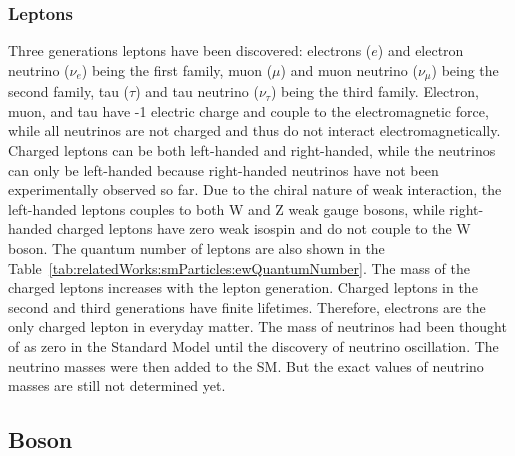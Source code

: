 \subsubsection{Leptons}
Three generations leptons have been discovered: electrons ($e$) and electron neutrino ($\nu_e$) being the first family, muon ($\mu$) and muon neutrino ($\nu_\mu$) being the second family, tau ($\tau$) and tau neutrino ($\nu_\tau$) being the third family. Electron, muon, and tau have -1 electric charge and couple to the electromagnetic force, while all neutrinos are not charged and thus do not interact electromagnetically. Charged leptons can be both left-handed and right-handed, while the neutrinos can only be left-handed because right-handed neutrinos have not been experimentally observed so far. Due to the chiral nature of weak interaction, the left-handed leptons couples to both W and Z weak gauge bosons, while right-handed charged leptons have zero weak isospin and do not couple to the W boson. The quantum number of leptons are also shown in the Table~\ref{tab:relatedWorks:smParticles:ewQuantumNumber}. The mass of the charged leptons increases with the lepton generation. Charged leptons in the second and third generations have finite lifetimes. Therefore, electrons are the only charged lepton in everyday matter. The mass of neutrinos had been thought of as zero in the Standard Model until the discovery of neutrino oscillation. The neutrino masses were then added to the SM. But the exact values of neutrino masses are still not determined yet.




\subsection{Boson}
\label{sec:relatedWorks:smParticles:boson}

